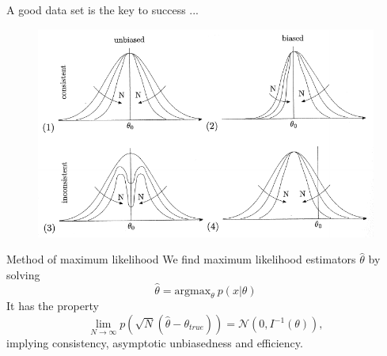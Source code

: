 \documentclass[
aspectratio=169,
14pt,
professionalfonts
]{beamer}
\begin{document}
\begin{frame}{A good data set is the key to success ...}
    \begin{figure}
    \centering
    \includegraphics[width=0.8\linewidth]{../plots/estimator.pdf}
\end{figure}
\end{frame}

\begin{frame}{Method of maximum likelihood}
    \vspace{-0.2cm}
    We find maximum likelihood estimators $ \hat \theta$ by solving
    $$\hat \theta = \text{argmax}_\theta ~ p(x|\theta)$$
    It has the property
    $$
    \lim_{N \to \infty} p\left(\sqrt{N}(\hat \theta - \theta_{true})\right) = \mathcal{N}\left(0, I^{-1}(\theta)\right),
    $$
    implying consistency, asymptotic unbiasedness and efficiency.
\end{frame}

\end{document}
